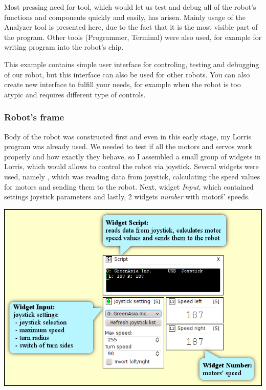 \documentclass[12pt, a4paper, oneside]{article}
\newcommand{\It}{\textit}  %
\begin{document}
Most pressing need for tool, which would let us test and debug all of the robot's functions and components quickly and easily, has arisen. Mainly usage of the Analyzer tool is presented here, due to the fact that it is the most visible part of the program. Other tools (Programmer, Terminal) were also used, for example for writing program into the robot's chip.

This example contains simple user interface for controling, testing and debugging of our robot, but this interface can also be used for other robots. You can also create new interface to fulfill your needs, for example when the robot is too atypic and requires different type of controls.

\newpage
\subsubsection{Robot's frame}
Body of the robot  was constructed first and even in this early stage, my Lorris program was already used. We needed to test if all the motors and servos work properly and how exactly they behave, so I assembled a small group of widgets in Lorris, which would allows to control the robot via joystick. Several widgets were used, namely , which was reading data from joystick, calculating the speed values for motors and sending them to the robot. Next, widget \It{Input}, which contained settings joystick parameters and lastly, 2 widgets \It{number} with motors̈́' speeds.
\vspace{30mm}
\begin{center}
\includegraphics[width=\textwidth]{img/joystick_david.png}
\end{center}
\end{document}
